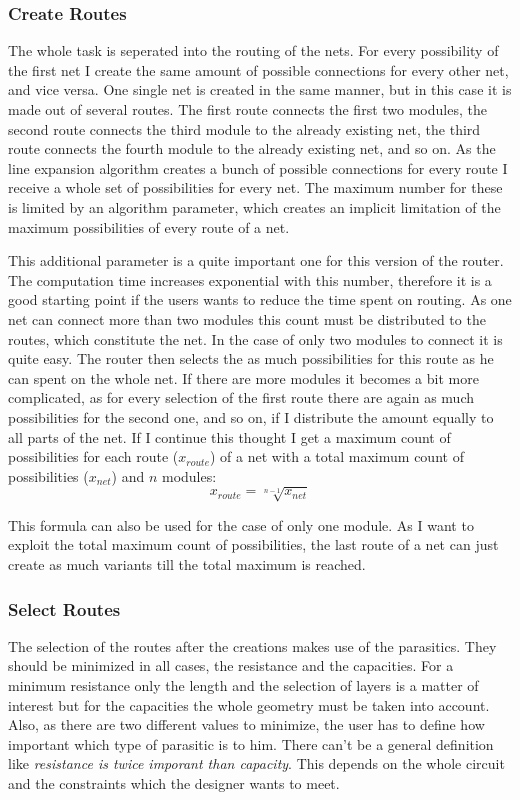 \subsubsection{Create Routes}
The whole task is seperated into the routing of the nets. For every possibility of the first net I create the same amount of possible connections for every other net, and vice versa. One single net is created in the same manner, but in this case it is made out of several routes. The first route connects the first two modules, the second route connects the third module to the already existing net, the third route connects the fourth module to the already existing net, and so on. As the line expansion algorithm creates a bunch of possible connections for every route I receive a whole set of possibilities for every net. The maximum number for these is limited by an algorithm parameter, which creates an implicit limitation of the maximum possibilities of every route of a net.

This additional parameter is a quite important one for this version of the router. The computation time increases exponential with this number, therefore it is a good starting point if the users wants to reduce the time spent on routing. As one net can connect more than two modules this count must be distributed to the routes, which constitute the net. In the case of only two modules to connect it is quite easy. The router then selects the as much possibilities for this route as he can spent on the whole net. If there are more modules it becomes a bit more complicated, as for every selection of the first route there are again as much possibilities for the second one, and so on, if I distribute the amount equally to all parts of the net. If I continue this thought I get a maximum count of possibilities for each route ($x_{route}$) of a net with a total maximum count of possibilities ($x_{net}$) and $n$ modules:
\[x_{route} = \sqrt[n - 1]{x_{net}}\]

This formula can also be used for the case of only one module. As I want to exploit the total maximum count of possibilities, the last route of a net can just create as much variants till the total maximum is reached.

\subsubsection{Select Routes}
The selection of the routes after the creations makes use of the parasitics. They should be minimized in all cases, the resistance and the capacities. For a minimum resistance only the length and the selection of layers is a matter of interest but for the capacities the whole geometry must be taken into account. Also, as there are two different values to minimize, the user has to define how important which type of parasitic is to him. There can't be a general definition like \emph{resistance is twice imporant than capacity}. This depends on the whole circuit and the constraints which the designer wants to meet.

